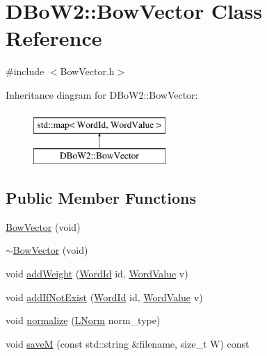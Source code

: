 \hypertarget{class_d_bo_w2_1_1_bow_vector}{}\section{D\+Bo\+W2\+:\+:Bow\+Vector Class Reference}
\label{class_d_bo_w2_1_1_bow_vector}


{\ttfamily \#include $<$Bow\+Vector.\+h$>$}

Inheritance diagram for D\+Bo\+W2\+:\+:Bow\+Vector\+:\begin{figure}[H]
\begin{center}
\leavevmode
\includegraphics[height=2.000000cm]{class_d_bo_w2_1_1_bow_vector}
\end{center}
\end{figure}
\subsection*{Public Member Functions}
\begin{DoxyCompactItemize}
\item 
\mbox{\hyperlink{class_d_bo_w2_1_1_bow_vector_ac4da23e700adc4ee083d66b23ce86e90}{Bow\+Vector}} (void)
\item 
\mbox{\hyperlink{class_d_bo_w2_1_1_bow_vector_a7210cac6ce006c7232f4d097faa338d0}{$\sim$\+Bow\+Vector}} (void)
\item 
void \mbox{\hyperlink{class_d_bo_w2_1_1_bow_vector_a3ac92a805b252c93dc6535240d02df47}{add\+Weight}} (\mbox{\hyperlink{namespace_d_bo_w2_ab1a0d3283b2d4690a383372ed20bfeb5}{Word\+Id}} id, \mbox{\hyperlink{namespace_d_bo_w2_a55fcd7333e591a38e96b91f41bc182f6}{Word\+Value}} v)
\item 
void \mbox{\hyperlink{class_d_bo_w2_1_1_bow_vector_a5ddf10e444d10425e5bd3568dc7ffe5e}{add\+If\+Not\+Exist}} (\mbox{\hyperlink{namespace_d_bo_w2_ab1a0d3283b2d4690a383372ed20bfeb5}{Word\+Id}} id, \mbox{\hyperlink{namespace_d_bo_w2_a55fcd7333e591a38e96b91f41bc182f6}{Word\+Value}} v)
\item 
void \mbox{\hyperlink{class_d_bo_w2_1_1_bow_vector_acd2dd34023e3053a4cc75d70c8b6ac13}{normalize}} (\mbox{\hyperlink{namespace_d_bo_w2_a53e9e0bcfc25c861815e413a7cf3fa51}{L\+Norm}} norm\+\_\+type)
\item 
void \mbox{\hyperlink{class_d_bo_w2_1_1_bow_vector_a0611e948f987574161c121231341537b}{saveM}} (const std\+::string \&filename, size\+\_\+t W) const
\end{DoxyCompactItemize}
